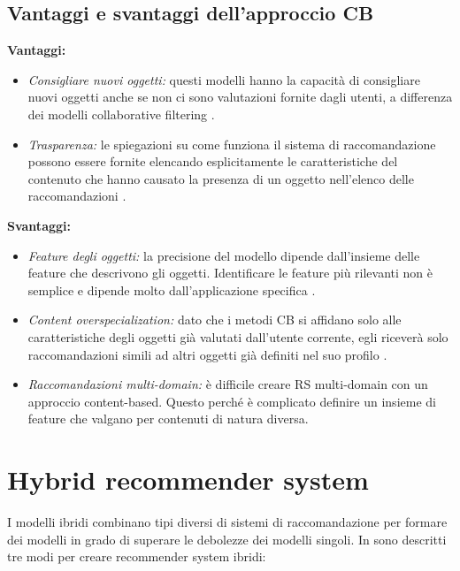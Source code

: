 \subsection{Vantaggi e svantaggi dell'approccio CB}
\textbf{Vantaggi:}
\begin{itemize}
 \item \textit{Consigliare nuovi oggetti:} questi modelli hanno la capacità di consigliare nuovi oggetti anche se non ci sono valutazioni fornite dagli utenti, a differenza dei modelli collaborative filtering \cite{recsys-principle-methods-evaluation}.
 
 \item \textit{Trasparenza:} le spiegazioni su come funziona il sistema di raccomandazione possono essere fornite elencando esplicitamente le caratteristiche del contenuto che hanno causato la presenza di un oggetto nell'elenco delle raccomandazioni \cite{transparency}. 
\end{itemize}

\noindent \textbf{Svantaggi:}
\begin{itemize}
 \item \textit{Feature degli oggetti:} la precisione del modello dipende dall'insieme delle feature che descrivono gli oggetti. Identificare le feature più rilevanti non è semplice e dipende molto dall'applicazione specifica \cite{survey-mattia}.
 
 \item \textit{Content overspecialization:} dato che i metodi CB si affidano solo alle caratteristiche degli oggetti già valutati dall'utente corrente, egli riceverà solo raccomandazioni simili ad altri oggetti già definiti nel suo profilo \cite{recsys-principle-methods-evaluation}.
 
 \item \textit{Raccomandazioni multi-domain:} è difficile creare RS multi-domain con un approccio content-based. Questo perché è complicato definire un insieme di feature che valgano per contenuti di natura diversa.
\end{itemize}

\section{Hybrid recommender system}
I modelli ibridi combinano tipi diversi di sistemi di raccomandazione per formare dei modelli in grado di superare le debolezze dei modelli singoli. In \cite{recsys-book} sono descritti tre modi per creare recommender system ibridi:

